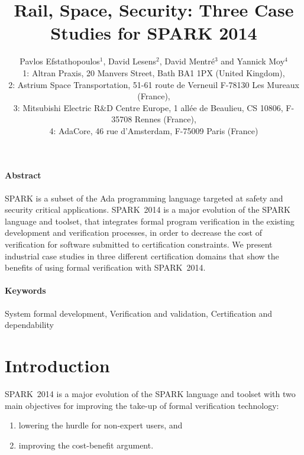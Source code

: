 \documentclass[10pt,a4paper,twocolumn]{article}
\newcommand{\newspark}{SPARK~2014\xspace}
\begin{document}
\title{Rail, Space, Security: Three Case Studies for SPARK 2014}

\author{%
\large Pavlos Efstathopoulos$^1$, David Lesens$^2$, David Mentré$^3$ and Yannick Moy$^4$\\
\normalsize 1: Altran Praxis, 20 Manvers Street, Bath BA1 1PX (United Kingdom),\\
\normalsize 2: Astrium Space Transportation, 51-61 route de Verneuil F-78130 Les Mureaux (France),\\
\normalsize 3: Mitsubishi Electric R\&D Centre Europe, 1 allée de
Beaulieu, CS 10806, F-35708 Rennes (France),\\
\normalsize 4: AdaCore, 46 rue d'Amsterdam, F-75009 Paris (France)}

\date{}

\maketitle

\paragraph{Abstract}
SPARK is a subset of the Ada programming language targeted at safety and
security critical applications. \newspark is a major evolution of the SPARK
language and toolset, that integrates formal program verification in the
existing development and verification processes, in order to decrease the cost
of verification for software submitted to certification constraints. We present
industrial case studies in three different certification domains that show the
benefits of using formal verification with \newspark.

\paragraph{Keywords}
System formal development, Verification and validation,
Certification and dependability

\section{Introduction}

\newspark is a major evolution of the SPARK language and toolset with two main objectives for improving the take-up of formal verification technology:
%
\begin{enumerate}
\item lowering the hurdle for non-expert users, and
\item improving the cost-benefit argument.
\end{enumerate}
\end{document}
